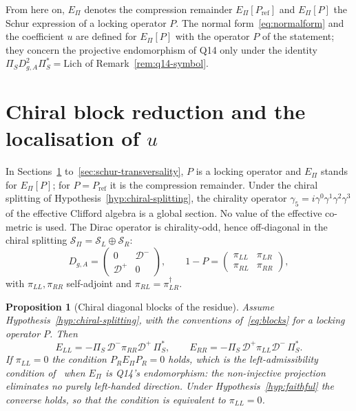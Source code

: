 \documentclass[11pt]{article}
\newtheorem{proposition}{Proposition}
\theoremstyle{definition}
\newcommand{\EPi}{E_\Pi}
\newcommand{\PiS}{\Pi_S}
\newcommand{\Deff}{\mathcal D}
\begin{document}
    From here on, $\EPi$ denotes the compression remainder $\EPi[P_{\mathrm{ref}}]$ and $\EPi[P]$ the Schur expression
      of
    a locking operator $P$.
    The normal form~\eqref{eq:normalform} and the coefficient $u$ are defined for $\EPi[P]$ with the operator $P$ of the
    statement; they concern the projective endomorphism of Q14 only under the identity
    $\PiS D_{g,A}^2\PiS^{*}=\mathrm{Lich}$ of Remark~\ref{rem:q14-symbol}.

  \section{Chiral block reduction and the localisation of \texorpdfstring{$u$}{u}}
    \label{sec:chiral}

    In Sections~\ref{sec:chiral} to~\ref{sec:schur-transversality}, $P$ is a locking operator and $\EPi$ stands for
    $\EPi[P]$; for $P=P_{\mathrm{ref}}$ it is the compression remainder.
    Under the chiral splitting of Hypothesis~\ref{hyp:chiral-splitting}, the chirality operator
    $\gamma_5=i\gamma^0\gamma^1\gamma^2\gamma^3$ of the effective Clifford algebra is a global section.
    No value of the effective co-metric is used.
    The Dirac operator is chirality-odd, hence off-diagonal in the chiral splitting
    $\mathcal S_\Pi=\mathcal S_L\oplus\mathcal S_R$:
    \begin{equation}
      \label{eq:blocks}
      D_{g,A}=\begin{pmatrix}0&\Deff^{-}\\ \Deff^{+}&0\end{pmatrix},
      \qquad
      1-P=\begin{pmatrix}\pi_{LL}&\pi_{LR}\\ \pi_{RL}&\pi_{RR}\end{pmatrix},
    \end{equation}
    with $\pi_{LL},\pi_{RR}$ self-adjoint and $\pi_{RL}=\pi_{LR}^{\dagger}$.

    \begin{proposition}[Chiral diagonal blocks of the residue]
      \label{prop:chiralblocks}
      Assume Hypothesis~\ref{hyp:chiral-splitting}, with the conventions of~\eqref{eq:blocks} for a locking operator
      $P$.
      Then
      \begin{equation}
        \label{eq:diag}
        E_{LL}=-\PiS\,\Deff^{-}\pi_{RR}\Deff^{+}\,\PiS^{*},\qquad
        E_{RR}=-\PiS\,\Deff^{+}\pi_{LL}\Deff^{-}\,\PiS^{*}.
      \end{equation}
      If $\pi_{LL}=0$ the condition $P_R\EPi P_R=0$ holds, which is the left-admissibility condition
      of~\cite{Beau2026q14} when $\EPi$ is Q14's endomorphism: the non-injective
      projection eliminates no purely left-handed direction.
      Under Hypothesis~\ref{hyp:faithful} the converse holds, so that the condition is equivalent to $\pi_{LL}=0$.
    \end{proposition}
\end{document}
